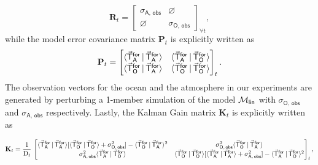 \documentclass[a4paper,10pt]{article}
\begin{document}
\begin{multicols}{2}
\begin{equation}
\mathbf{R}_t = 
\begin{bmatrix}
    \sigma_{\mathsf{A},\,\mathsf{obs}} & \varnothing \\
    \varnothing & \sigma_{\mathsf{O},\,\mathsf{obs}}
\end{bmatrix}_{\forall t},
\label{eq:R}
\end{equation}
while the model error covariance matrix $\mathbf{P}_t$ is explicitly written as 
\begin{equation}
\mathbf{P}_t = 
\begin{bmatrix}
    \inner{A}{A} & \inner{A}{O} \\
    \inner{O}{A} & \inner{O}{O}
\end{bmatrix}_t.
\label{eq:P}
\end{equation}
The observation vectors for the ocean and the atmosphere in our experiments are generated by perturbing a 1-member simulation of the model $\mathcal{M}_\mathsf{lin}$ with $\sigma_{\mathsf{O},\,\mathsf{obs}}$ and $\sigma_{\mathsf{A},\,\mathsf{obs}}$ respectively. Lastly, the Kalman Gain matrix $\mathbf{K}_t$ is explicitly written as 
\end{multicols}
\begin{equation}
\mathbf{K}_t = 
\frac{1}{\mathrm{D}_t}\,\begin{bmatrix}
    \inner{A}{A}[\inner{O}{O} + \sigma^2_{\mathsf{O},\,\mathsf{obs}}] - \inner{O}{A}^2 & \sigma^2_{\mathsf{O},\,\mathsf{obs}}\inner{O}{A} \\
    \sigma^2_{\mathsf{A},\,\mathsf{obs}}\inner{A}{O} & \inner{O}{O}[\inner{A}{A} + \sigma^2_{\mathsf{A},\,\mathsf{obs}}] - \inner{A}{O}^2
\end{bmatrix}_t,
\label{eq:kgain2}
\end{equation}
\end{document}
